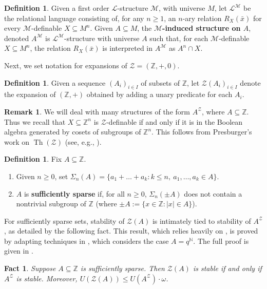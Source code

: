 \documentclass{amsart}
\def\seq{\subseteq}
\def\Th{\operatorname{Th}}
\newcommand{\xbar}{\bar{x}}
\newcommand{\cL}{\mathcal{L}}
\newcommand{\cM}{\mathcal{M}}
\newcommand{\cZ}{\mathcal{Z}}
\def\N{\mathbb N}
\def\Z{\mathbb Z}
\newtheorem{fact}[theorem]{Fact}
\theoremstyle{definition}
\newtheorem{definition}[theorem]{Definition}
\newtheorem{remark}[theorem]{Remark}
\begin{document}
\begin{definition}
Given a first order $\cL$-structure $\cM$, with universe $M$, let $\cL^{\cM}$ be the relational language consisting of, for any $n\geq 1$, an $n$-ary relation $R_X(\xbar)$ for every $\cM$-definable $X\seq M^n$. Given $A\seq M$, the \textbf{$\cM$-induced structure on $A$}, denoted $A^{\cM}$ is $\cL^{\cM}$-structure with universe $A$ such that, for each $\cM$-definable $X\seq M^n$, the relation $R_X(\xbar)$ is interpreted in $A^{\cM}$ as $A^n\cap X$. 
\end{definition}


Next, we set notation for expansions of $\cZ=(\Z,+,0)$. 

\begin{definition}
Given a sequence $(A_i)_{i\in I}$ of subsets of $\Z$, let $\cZ(A_i)_{i\in I}$ denote the expansion of $(\Z,+)$ obtained by adding a unary predicate for each $A_i$.
\end{definition}


\begin{remark}\label{rem:Zdef}
We will deal with many structures of the form $A^{\cZ}$, where $A\seq\Z$. Thus we recall that $X\seq\Z^n$ is $\cZ$-definable  if and only if it is in the Boolean algebra generated by cosets of subgroups of $\Z^n$. This follows from Presburger's work on $\Th(\cZ)$ (see, e.g., \cite[Lemma 1.9 \& Fact 1.10]{IbKiTa}). 
\end{remark}

\begin{definition}\label{def:SS}\cite{CoSS}
Fix $A\seq\Z$.
\begin{enumerate}
\item Given $n\geq 0$, set $\Sigma_n(A)=\{a_1+\ldots+a_k:k\leq n,~a_1,\ldots,a_k\in A\}$.
\item $A$ is \textbf{sufficiently sparse} if, for all $n\geq 0$, $\Sigma_n(\pm A)$ does not contain a nontrivial subgroup of $\Z$ (where $\pm A:=\{x\in\Z:|x|\in A\}$).
\end{enumerate}
\end{definition}



For sufficiently sparse sets, stability of $\cZ(A)$ is intimately tied to stability of $A^{\cZ}$, as detailed by the following fact. This result, which relies heavily on \cite{CaZi}, is proved by adapting techniques in \cite[Section 2]{PaSk}, which considers the case $A=q^{\N}$. The full proof is given in \cite[Theorems 2.11 \& 4.5]{CoSS}. 

\begin{fact}\label{fact:CZstable}
Suppose $A\seq\Z$ is sufficiently sparse. Then $\cZ(A)$ is stable if and only if $A^{\cZ}$ is stable. Moreover, $U(\cZ(A))\leq U(A^{\cZ})\cdot\omega$.
\end{fact}
\end{document}
